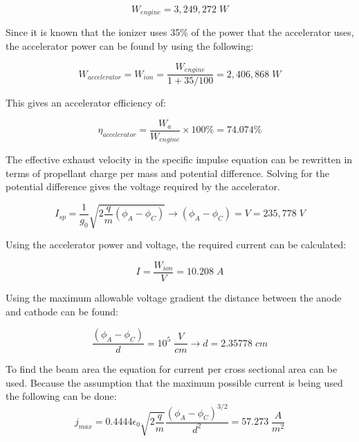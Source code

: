 \documentclass[journal ]{new-aiaa}
\begin{document}
\begin{equation*}
    W_{engine} = \boxed{3,249,272\; W}
\end{equation*}

Since it is known that the ionizer uses 35\% of the power that the accelerator uses, the accelerator power can be found by using the following:

\begin{equation}
    W_{accelerator} = W_{ion} = \frac{W_{engine}}{1+35/100} = 2,406,868 \;W
\end{equation}

\noindent This gives an accelerator efficiency of:

\begin{equation}
    \eta_{accelerator} =\frac{W_a}{W_{engine}} \times 100 \% = \boxed{74.074 \%}
\end{equation}


The effective exhaust velocity in the specific impulse equation can be rewritten in terms of propellant charge per mass and potential difference. Solving for the potential difference gives the voltage required by the accelerator.

\begin{equation}
    I_{sp} = \frac{1}{g_0} \sqrt{2 \frac{q}{m} \left(\phi_A - \phi_C \right)} 
    \rightarrow \left(\phi_A - \phi_C \right) = V = \boxed{235,778 \;V} 
\end{equation}

\noindent Using the accelerator power and voltage, the required current can be calculated:

\begin{equation}
    I = \frac{W_{ion}}{V} = \boxed{10.208\;A}
\end{equation}

\noindent Using the maximum allowable voltage gradient the distance between the anode and cathode can be found:

\begin{equation} 
    \frac{\left(\phi_A - \phi_C \right)}{d} = 10^5 \;\frac{V}{cm} \rightarrow d = \boxed{2.35778\;cm}
\end{equation}

To find the beam area the equation for current per cross sectional area can be used. Because the assumption that the maximum possible current is being used the following can be done:
\begin{equation} 
    j_{max} = 0.4444 \epsilon_0 \sqrt{2 \frac{q}{m}} \frac{\left(\phi_A - \phi_C \right)^{3/2}}{d^2} 
    = 57.273\; \frac{A}{m^2}
\end{equation}
\end{document}
